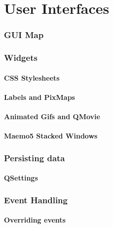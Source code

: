 \part{User Interfaces}
\section{GUI Map}

\section{Widgets}
\subsection{CSS Stylesheets}
\subsection{Labels and PixMaps}
\subsection{Animated Gifs and QMovie}
\subsection{Maemo5 Stacked Windows}

\section{Persisting data}
\subsection{QSettings}

\section{Event Handling}
\subsection{Overriding events}